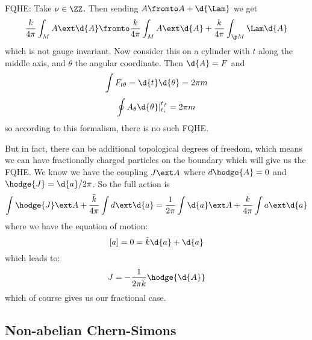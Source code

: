 \documentclass{booc}
\begin{document}
FQHE:
Take $\nu\in \ZZ$. Then sending $A\fromto A + \d{\Lam}$
we get
\begin{equation}
\frac{k}{4\pi} \int_M A\ext \d{A}
\fromto 
\frac{k}{4\pi} \int_M A\ext \d{A} + 
\frac{k}{4\pi} \int_{\p M} \Lam \d{A}
\end{equation}
which is not gauge invariant.
Now consider this on a cylinder with $t$ along the middle axis, and $\theta$
the angular coordinate.
Then $\d{A} = F$
and
\begin{equation}
\int F_{t \theta} = \d{t} \d{\theta} = 2\pi m
\end{equation}
\begin{equation}
\oint A_{\theta} \d{\theta}\vert_{t_i}^{t_f} = 2\pi m
\end{equation}
so according to this formalism, there is no such FQHE. 

But in fact, there can be additional topological degrees of freedom, which means we can
have fractionally charged particles on the boundary which will give us the FQHE. 
We know we have the coupling $J\ext A$
where $d\hodge{A} = 0$ and $\hodge{J} = \d{a} / 2\pi $.
So the full action is
\begin{equation}
\int \hodge{J} \ext A + 
\frac{\tilde k}{4\pi} \int d\ext \d{a} = 
\frac{1}{2\pi} \int \d{a} \ext A + \frac{k}{4\pi} \int a\ext \d{a}
\end{equation}
where we have the equation of motion:
\begin{equation}
\left[ a \right] = 0 = \tilde k \d{a} + \d{a}
\end{equation}
which leads to:
\begin{equation}
J = -\frac{1}{2\pi\tilde k} \hodge{\d {A}}
\end{equation}
which of course gives us our fractional case. 

\subsection{Non-abelian Chern-Simons}
\end{document}
